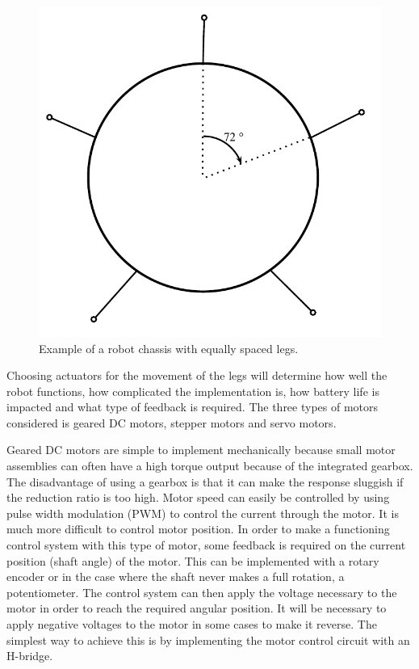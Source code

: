 \FloatBarrier
\begin{figure}[h]
\centering
\includegraphics[scale = 1]{pics/Body_Layout.pdf}
\caption{Example of a robot chassis with equally spaced legs.}
\label{fig:Body_Layout}
\end{figure}
\FloatBarrier

Choosing actuators for the movement of the legs will determine how well the robot functions, how complicated the implementation is, how battery life is impacted and what type of feedback is required. The three types of motors considered is geared DC motors, stepper motors and servo motors.

Geared DC motors are simple to implement mechanically because small motor assemblies can often have a high torque output because of the integrated gearbox. The disadvantage of using a gearbox is that it can make the response sluggish if the reduction ratio is too high. Motor speed can easily be controlled by using pulse width modulation (PWM) to control the current through the motor. It is much more difficult to control motor position. In order to make a functioning control system with this type of motor, some feedback is required on the current position (shaft angle) of the motor. This can be implemented with a rotary encoder or in the case where the shaft never makes a full rotation, a potentiometer. The control system can then apply the voltage necessary to the motor in order to reach the required angular position. It will be necessary to apply negative voltages to the motor in some cases to make it reverse. The simplest way to achieve this is by implementing the motor control circuit with an H-bridge.


